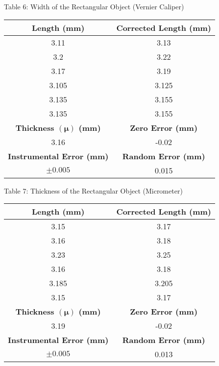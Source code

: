 \begin{center}
Table 6: Width of the Rectangular Object (Vernier Caliper)
\begin{center}
    \begin{tabular}{|c|c|}
        \hline
        \textbf{Length (mm)} & \textbf{Corrected Length (mm)} \\
        \hline
        3.11 & 3.13 \\
        \hline
        3.2 & 3.22 \\
        \hline
        3.17 & 3.19 \\
        \hline
        3.105 & 3.125  \\
        \hline
        3.135 & 3.155  \\
        \hline
        3.135 & 3.155  \\
        \hline
        \hline
        \textbf{Thickness $(\bm{\mu})$ (mm)} & \textbf{Zero Error (mm)}  \\
        \hline
        3.16 & -0.02 \\
        \hline
        \hline
        \textbf{Instrumental Error (mm)} & \textbf{Random Error (mm)}  \\
        \hline
        \(\pm0.005\) & 0.015 \\
        \hline
    \end{tabular}
\end{center}
Table 7: Thickness of the Rectangular Object (Micrometer)
\begin{center}
    \begin{tabular}{|c|c|}
        \hline
        \textbf{Length (mm)} & \textbf{Corrected Length (mm)} \\
        \hline
        3.15 & 3.17 \\
        \hline
        3.16 & 3.18 \\
        \hline
        3.23 & 3.25 \\
        \hline
        3.16 & 3.18  \\
        \hline
        3.185 & 3.205  \\
        \hline
        3.15 & 3.17  \\
        \hline
        \hline
        \textbf{Thickness $(\bm{\mu})$ (mm)} & \textbf{Zero Error (mm)}  \\
        \hline
        3.19 & -0.02 \\
        \hline
        \hline
        \textbf{Instrumental Error (mm)} & \textbf{Random Error (mm)}  \\
        \hline
        \(\pm0.005\) & 0.013 \\
        \hline

\end{tabular}
\end{center}
\end{center}

